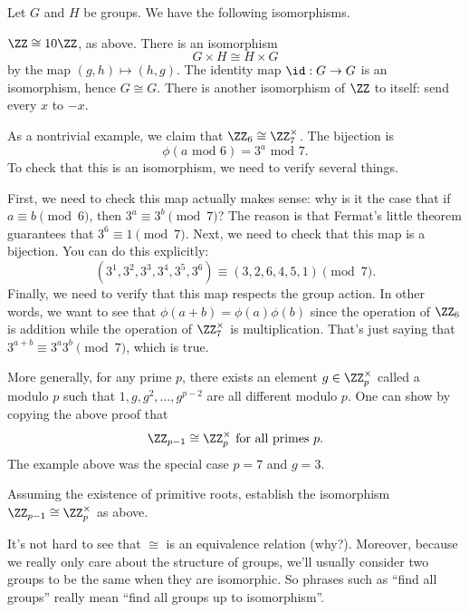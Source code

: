 \begin{example}
	Let $G$ and $H$ be groups.  We have the following isomorphisms.
	\begin{enumerate}[(a)]
		\ii $\ZZ \cong 10 \ZZ$, as above.
		\ii There is an isomorphism
		\[ G \times H \cong H \times G\]
		by the map $(g,h) \mapsto (h,g)$.
		\ii The identity map $\id : G \to G$
		is an isomorphism, hence $G \cong G$.
		\ii There is another isomorphism of $\ZZ$ to itself: send every $x$ to $-x$.
	\end{enumerate}
\end{example}
\begin{example}
	As a nontrivial example, we claim that $\Zc 6 \cong \Zm 7$.
	The bijection is
	\[ \phi(\text{$a$ mod $6$}) = \text{$3^a$ mod $7$}. \]
	To check that this is an isomorphism, we need to verify several things.
	\begin{itemize}
		\ii First, we need to check this map actually makes sense:
		why is it the case that if $a \equiv b \pmod 6$, then $3^a \equiv 3^b \pmod 7$?
		The reason is that Fermat's little theorem guarantees that $3^6 \equiv 1 \pmod 7$.
		\ii Next, we need to check that this map is a bijection.
		You can do this explicitly:
		\[ (3^1, 3^2, 3^3, 3^4, 3^5, 3^6)
			\equiv (3,2,6,4,5,1) \pmod 7. \]
		\ii Finally, we need to verify that this map respects the group action.
		In other words, we want to see that
		$\phi(a+b) = \phi(a) \phi(b)$
		since the operation of $\Zc 6$ is addition
		while the operation of $\Zm 7$ is multiplication.
		That's just saying that $3^{a+b} \equiv 3^a 3^b \pmod 7$,
		which is true.
	\end{itemize}
\end{example}
\begin{example}
	More generally, for any prime $p$, there exists
	an element $g \in \Zm p$ called a  modulo $p$
	such that $1, g, g^2, \dots, g^{p-2}$ are all different modulo $p$.
	One can show by copying the above proof that
	\[ \Zc {p-1} \cong \Zm p \text{ for all primes $p$}. \]
	The example above was the special case $p=7$ and $g=3$.
\end{example}
\begin{exercise}
	Assuming the existence of primitive roots,
	establish the isomorphism $\Zc {p-1} \cong \Zm p$ as above.
\end{exercise}

It's not hard to see that $\cong$ is an equivalence relation (why?).
Moreover, because we really only care about the structure of groups,
we'll usually consider two groups to be the same when they are isomorphic.
So phrases such as ``find all groups'' really mean 
``find all groups up to isomorphism''.

